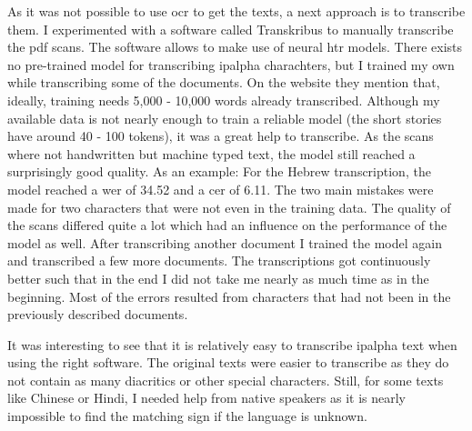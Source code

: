 As it was not possible to use \ac{ocr} to get the texts, a next approach is to transcribe them. I experimented with a software called Transkribus to manually transcribe the pdf scans. The software allows to make use of neural \ac{htr} models. There exists no pre-trained model for transcribing \ac{ipalpha} charachters, but I trained my own while transcribing some of the documents. On the website they mention that, ideally, training needs 5,000 - 10,000 words already transcribed. Although my available data is not nearly enough to train a reliable model (the short stories have around 40 - 100 tokens), it was a great help to transcribe. As the scans where not handwritten but machine typed text, the model still reached a surprisingly good quality. As an example: For the Hebrew transcription, the model reached a \ac{wer} of 34.52 and a \ac{cer} of 6.11. The two main mistakes were made for two characters that were not even in the training data. The quality of the scans differed quite a lot which had an influence on the performance of the model as well. After transcribing another document I trained the model again and transcribed a few more documents. The transcriptions got continuously better such that in the end I did not take me nearly as much time as in the beginning. Most of the errors resulted from characters that had not been in the previously described documents. 

It was interesting to see that it is relatively easy to transcribe \ac{ipalpha} text when using the right software. The original texts were easier to transcribe as they do not contain as many diacritics or other special characters. Still, for some texts like Chinese or Hindi, I needed help from native speakers as it is nearly impossible to find the matching sign if the language is unknown. 

